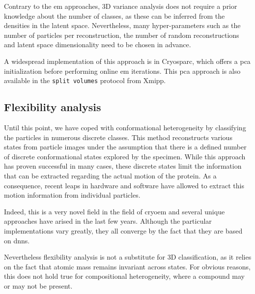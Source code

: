 \documentclass[../main.tex]{subfiles}
\begin{document}
Contrary to the \gls{em} approaches, 3D variance analysis does not require a prior knowledge about the number of classes, as these can be inferred from the densities in the latent space\cite{jonic2016}. Nevertheless, many hyper-parameters such as the number of particles per reconstruction, the number of random reconstructions and latent space dimensionality need to be chosen in advance.

A widespread implementation of this approach is in Cryosparc, which offers a \gls{pca} initialization before performing online \gls{em} iterations\cite{cryosparc}. This \gls{pca} approach is also available in the \texttt{split volumes} protocol from Xmipp\cite{strelak2021a}.

\subsection{Flexibility analysis}
Until this point, we have coped with conformational heterogeneity by classifying the particles in numerous discrete classes. This method reconstructs various states from particle images under the assumption that there is a defined number of discrete conformational states explored by the specimen. While this approach has proven successful in many cases, these discrete states limit the information that can be extracted regarding the actual motion of the protein. As a consequence, recent leaps in hardware and software have allowed to extract this motion information from individual particles\cite{herreros2023}.

Indeed, this is a very novel field in the field of \gls{cryoem} and several unique approaches have arised in the last few years. Although the particular implementations vary greatly, they all converge by the fact that they are based on \glspl{dnn}\cite{schwab2023}. 

Nevertheless flexibility analysis is not a substitute for 3D classification, as it relies on the fact that atomic mass remains invariant across states. For obvious reasons, this does not hold true for compositional heterogeneity, where a compound may or may not be present. 
\end{document}
